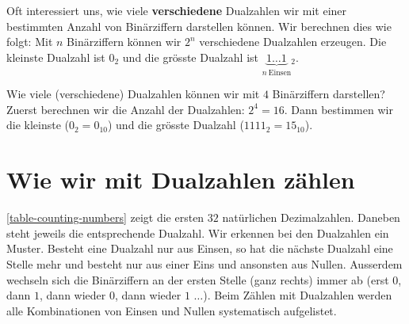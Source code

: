 Oft interessiert uns, wie viele \textbf{verschiedene} Dualzahlen wir mit einer bestimmten Anzahl von Binärziffern darstellen können. Wir berechnen dies wie folgt: Mit $n$ Binärziffern können wir $2^n$ verschiedene Dualzahlen erzeugen. Die kleinste Dualzahl ist $0_2$ und die grösste Dualzahl ist $\underbrace{1\dots1}_{n~\textrm{Einsen}}$$_2$.

\begin{example}
Wie viele (verschiedene) Dualzahlen können wir mit $4$ Binärziffern darstellen? Zuerst berechnen wir die Anzahl der Dualzahlen: $2^4 = 16$. Dann bestimmen wir die kleinste ($0_2 = 0_{10}$) und die grösste Dualzahl ($1111_2 = 15_{10}$).
\end{example}

\section{Wie wir mit Dualzahlen zählen}

\autoref{table-counting-numbers} zeigt die ersten $32$ natürlichen Dezimalzahlen. Daneben steht jeweils die entsprechende Dualzahl. Wir erkennen bei den Dualzahlen ein Muster. Besteht eine Dualzahl nur aus Einsen, so hat die nächste Dualzahl eine Stelle mehr und besteht nur aus einer Eins und ansonsten aus Nullen. Ausserdem wechseln sich die Binärziffern an der ersten Stelle (ganz rechts) immer ab (erst $0$, dann $1$, dann wieder $0$, dann wieder $1$ $\dots$). Beim Zählen mit Dualzahlen werden alle Kombinationen von Einsen und Nullen systematisch aufgelistet.

